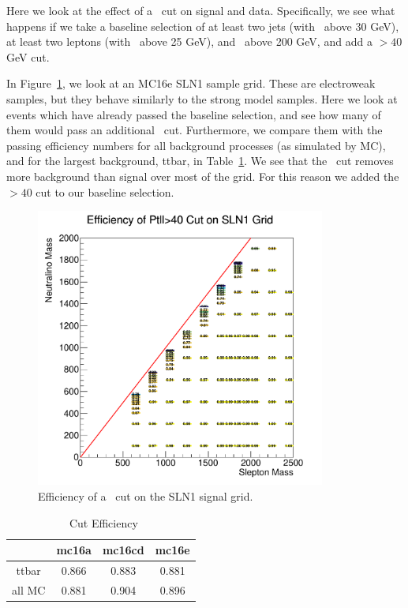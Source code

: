 Here we look at the effect of a \ptll\ cut on signal and data. Specifically, we see what happens if we take a baseline selection of at least two jets (with \pt\ above 30 GeV), at least two leptons (with \pt\ above 25 GeV), and \MET\ above 200 GeV, and add a \ptll$>40$ GeV cut.

In Figure~\ref{fig:ptll_cut}, we look at an MC16e SLN1 sample grid. These are electroweak samples, but they behave similarly to the strong model samples. Here we look at events which have already passed the baseline selection, and see how many of them would pass an additional \ptll\ cut. Furthermore, we compare them with the passing efficiency numbers for all background processes (as simulated by MC), and for the largest background, ttbar, in Table~\ref{tab:ptll_cut}. We see that the \ptll\ cut removes more background than signal over most of the grid. For this reason we added the \ptll$>40$ cut to our baseline selection.

\begin{figure}[htbp]
    \centering
    \includegraphics[width=0.85\textwidth]{Images/SUSY/ptll_cut_efficiency.pdf}
    \caption{Efficiency of a \ptll\ cut on the SLN1 signal grid.}
    \label{fig:ptll_cut}
\end{figure}

\begin{table}[htbp]
\caption{\ptll\ Cut Efficiency}
\begin{center}
\begin{tabular}{c|c|c|c}
& mc16a & mc16cd & mc16e \\
\hline
ttbar & 0.866 & 0.883 & 0.881 \\
all MC & 0.881 & 0.904 & 0.896 \\
\end{tabular}
\end{center}
\label{tab:ptll_cut} 
\end{table}

